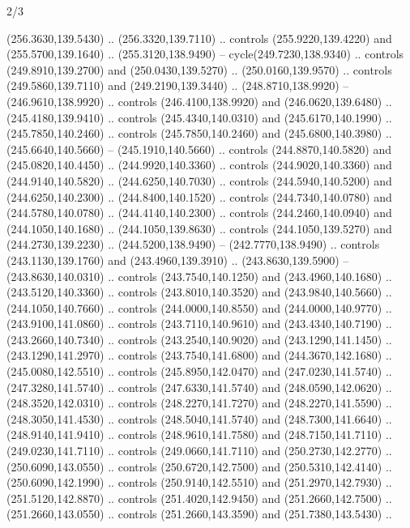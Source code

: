 \begin{flagdescription}{2/3}
\begin{scope}[xshift=0.5\flaglength,yshift=0.5\flagwidth,scale=\flagwidth/259.2]
\begin{scope}[y=0.8pt, x=0.8pt, yscale=-1,shift={(-243,-162)}]
      (256.3630,139.5430) .. (256.3320,139.7110) .. controls (255.9220,139.4220) and
      (255.5700,139.1640) .. (255.3120,138.9490) -- cycle(249.7230,138.9340) ..
      controls (249.8910,139.2700) and (250.0430,139.5270) .. (250.0160,139.9570) ..
      controls (249.5860,139.7110) and (249.2190,139.3440) .. (248.8710,138.9920) --
      (246.9610,138.9920) .. controls (246.4100,138.9920) and (246.0620,139.6480) ..
      (245.4180,139.9410) .. controls (245.4340,140.0310) and (245.6170,140.1990) ..
      (245.7850,140.2460) .. controls (245.7850,140.2460) and (245.6800,140.3980) ..
      (245.6640,140.5660) -- (245.1910,140.5660) .. controls (244.8870,140.5820) and
      (245.0820,140.4450) .. (244.9920,140.3360) .. controls (244.9020,140.3360) and
      (244.9140,140.5820) .. (244.6250,140.7030) .. controls (244.5940,140.5200) and
      (244.6250,140.2300) .. (244.8400,140.1520) .. controls (244.7340,140.0780) and
      (244.5780,140.0780) .. (244.4140,140.2300) .. controls (244.2460,140.0940) and
      (244.1050,140.1680) .. (244.1050,139.8630) .. controls (244.1050,139.5270) and
      (244.2730,139.2230) .. (244.5200,138.9490) -- (242.7770,138.9490) .. controls
      (243.1130,139.1760) and (243.4960,139.3910) .. (243.8630,139.5900) --
      (243.8630,140.0310) .. controls (243.7540,140.1250) and (243.4960,140.1680) ..
      (243.5120,140.3360) .. controls (243.8010,140.3520) and (243.9840,140.5660) ..
      (244.1050,140.7660) .. controls (244.0000,140.8550) and (244.0000,140.9770) ..
      (243.9100,141.0860) .. controls (243.7110,140.9610) and (243.4340,140.7190) ..
      (243.2660,140.7340) .. controls (243.2540,140.9020) and (243.1290,141.1450) ..
      (243.1290,141.2970) .. controls (243.7540,141.6800) and (244.3670,142.1680) ..
      (245.0080,142.5510) .. controls (245.8950,142.0470) and (247.0230,141.5740) ..
      (247.3280,141.5740) .. controls (247.6330,141.5740) and (248.0590,142.0620) ..
      (248.3520,142.0310) .. controls (248.2270,141.7270) and (248.2270,141.5590) ..
      (248.3050,141.4530) .. controls (248.5040,141.5740) and (248.7300,141.6640) ..
      (248.9140,141.9410) .. controls (248.9610,141.7580) and (248.7150,141.7110) ..
      (249.0230,141.7110) .. controls (249.0660,141.7110) and (250.2730,142.2770) ..
      (250.6090,143.0550) .. controls (250.6720,142.7500) and (250.5310,142.4140) ..
      (250.6090,142.1990) .. controls (250.9140,142.5510) and (251.2970,142.7930) ..
      (251.5120,142.8870) .. controls (251.4020,142.9450) and (251.2660,142.7500) ..
      (251.2660,143.0550) .. controls (251.2660,143.3590) and (251.7380,143.5430) ..

\end{scope}
\end{scope}
\end{flagdescription}
